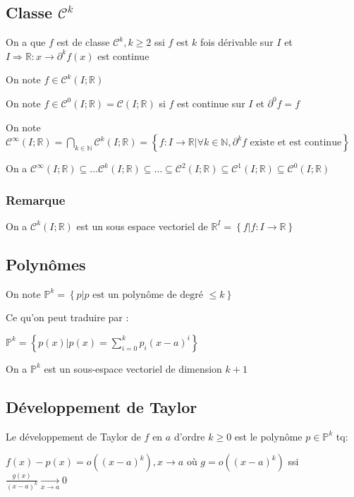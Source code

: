 \documentclass[a4paper,10pt]{article}
\newcommand{\ap}{\rightarrow}
\newcommand{\R}{\mathbb{R}}
\newcommand{\N}{\mathbb{N}}
\newcommand{\so}{\Rightarrow}
\newcommand{\tset}[1]{\left\lbrace #1 \right\rbrace}
\newcommand{\conv}[1]{\mathop{\longrightarrow}\limits_{#1}}
\newcommand{\cclass}[3]{\mathcal{C}^{#1} (#2;#3)}
\newcommand{\Poly}{\mathbb{P}}
\begin{document}
\subsection{Classe $\mathcal{C}^k$}

On a que $f$ est de classe $\mathcal{C}^k, k \geq 2$ ssi $f$ est $k$ fois dérivable sur $I$ et $I \so \R: x \ap \partial^k f(x)$ est continue

On note $f \in \mathcal{C}^k (I;\R)$

On note $f \in \mathcal{C}^0 (I;\R) = \mathcal{C} (I ; \R)$ si $f$ est continue sur $I$ et $\partial^0 f = f$

On note $\cclass{\infty}{I}{\R} = \bigcap\limits_{k\in \N} \cclass{k}{I}{\R} = \tset{f : I \ap \R \vert \forall k \in \N, \partial^k f \mbox{ existe et est continue} }$

On a $\cclass{\infty}{I}{\R} \subseteq \dots \cclass{k}{I}{\R} \subseteq \dots \subseteq \cclass{2}{I}{\R} \subseteq \cclass{1}{I}{\R} \subseteq \cclass{0}{I}{\R}$

\subsubsection{Remarque}

On a $\cclass{k}{I}{\R}$ est un sous espace vectoriel de $\R^I = \tset{f \vert f:I \ap \R}$


\subsection{Polynômes}

On note $\Poly^k = \tset{p \vert p \mbox{ est un polynôme de degré } \leq k}$

Ce qu'on peut traduire par :

$\Poly^k = \tset{p(x) \vert p(x) = \sum_{i=0}^{k} p_i \left( x-a \right)^i}$

On a $\Poly^k$ est un sous-espace vectoriel de dimension $k+1$

\subsection{Développement de Taylor}

Le développement de Taylor de $f$ en $a$ d'ordre $k \geq 0$ est le polynôme $p \in \Poly^k$ tq:

$f(x) - p(x) = o\left( \left( x-a \right)^k \right), x \ap a$ où $g = o\left( \left( x-a \right)^k \right)$ ssi $\frac{g(x)}{\left( x-a \right)^k} \conv{x \ap a} 0$
\end{document}
